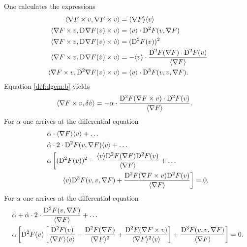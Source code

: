 One calculates the expressions
\begin{subequations}
    \begin{align}
        \langle  \nabla F  \times v ,  \nabla F  \times v  \rangle  &=
        \langle  \nabla F   \rangle \langle  v  \rangle\\
        \langle  \nabla F  \times v ,  \mathrm{D}^{  } \nabla F  ( v ) \times v  \rangle  &=
        \langle  v  \rangle \cdot \mathrm{D}^{ 2 } F ( v, \nabla F  )\\
        \langle  \nabla F  \times v ,  \mathrm{D}^{  } \nabla F  ( v ) \times \dot{ v }  \rangle  &=
        ( \mathrm{D}^{ 2 } F ( v ) )^2\\
        \langle  \nabla F  \times v ,  \mathrm{D}^{  } \nabla F  ( \dot{ v } ) \times v  \rangle  &=
        -  \langle  v  \rangle \cdot \frac{ \mathrm{D}^{ 2 } F ( \nabla F  ) \cdot \mathrm{D}^{ 2 } F ( v ) }{ \langle  \nabla F   \rangle }\\
        \langle  \nabla F  \times v ,  \mathrm{D}^{ 2 } \nabla F  ( v ) \times v  \rangle  &=
        \langle  v  \rangle \cdot \mathrm{D}^{ 3 } F ( v, v, \nabla F  ) .
    \end{align}
\end{subequations}
Equation \eqref{def:dgem:b} yields
\begin{align}
    \langle  \nabla F  \times v ,  \delta \dot{ v }  \rangle  &=
    -\alpha \cdot \frac{ \mathrm{D}^{ 2 } F ( \nabla F  \times v ) \cdot \mathrm{D}^{ 2 } F ( v ) }{ \langle  \nabla F   \rangle } .
\end{align}
For $ \alpha $ one arrives at the differential equation
\begin{align}
    &\ddot{ \alpha } \cdot \langle  \nabla F   \rangle \langle  v  \rangle  +  \dots\nonumber\\
    &\dot{ \alpha } \cdot 2 \cdot \mathrm{D}^{ 2 } F ( v, \nabla F  ) \langle  v  \rangle  +  \dots\nonumber\\
    &\alpha \left[ ( \mathrm{D}^{ 2 } F ( v ) )^2  -
    \frac{ \langle  v  \rangle \mathrm{D}^{ 2 } F ( \nabla F  ) \mathrm{D}^{ 2 } F ( v ) }{ \langle  \nabla F   \rangle }  +  \dots\right.\nonumber\\
    &\qquad\left.\langle  v  \rangle \mathrm{D}^{ 3 } F ( v, v, \nabla F  )  +
    \frac{ \mathrm{D}^{ 2 } F ( \nabla F  \times v ) \mathrm{D}^{ 2 } F ( v ) }{ \langle  \nabla F   \rangle } \right]  =  0 .
\end{align}
For $ \alpha $ one arrives at the differential equation
\begin{align}
    &\ddot{ \alpha }  +
    \dot{ \alpha } \cdot 2 \cdot \frac{ \mathrm{D}^{ 2 } F ( v, \nabla F  ) }
    { \langle  \nabla F   \rangle }  +  \dots\nonumber\\
    &\alpha \left[ \mathrm{D}^{ 2 } F ( v ) \left[ \frac{ \mathrm{D}^{ 2 } F ( v ) }{ \langle  \nabla F   \rangle \langle  v  \rangle }  -
    \frac{ \mathrm{D}^{ 2 } F ( \nabla F  ) }{ \langle  \nabla F   \rangle^2 }  +
    \frac{ \mathrm{D}^{ 2 } F ( \nabla F  \times v ) }{ \langle  \nabla F   \rangle^2 \langle  v  \rangle } \right]  +
    \frac{ \mathrm{D}^{ 3 } F ( v, v, \nabla F  ) }{ \langle  \nabla F   \rangle } \right]  =  0 .
\end{align}

